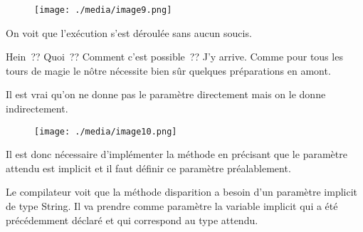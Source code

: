 \documentclass[12pt]{article}
\begin{document}
\vspace{\baselineskip}



\begin{figure}[H]
	\begin{Center}
		\texttt{[image: ./media/image9.png]}
	\end{Center}
\end{figure}



\par


\vspace{\baselineskip}
On voit que l’exécution s’est déroulée sans aucun soucis. \par

Hein ?? Quoi ?? Comment c’est possible ?? J’y arrive. Comme pour tous les tours de magie le nôtre nécessite bien sûr quelques préparations en amont. \par

Il est vrai qu’on ne donne pas le paramètre directement mais on le donne indirectement.\par


\vspace{\baselineskip}



\begin{figure}[H]
	\begin{Center}
		\texttt{[image: ./media/image10.png]}
	\end{Center}
\end{figure}



\par


\vspace{\baselineskip}

\vspace{\baselineskip}
Il est donc nécessaire d’implémenter la méthode en précisant que le paramètre attendu est implicit et il faut définir ce paramètre préalablement. \par

Le compilateur voit que la méthode disparition a besoin d’un paramètre implicit de type String. Il va prendre comme paramètre la variable implicit qui a été précédemment déclaré et qui correspond au type attendu.\par
\end{document}
